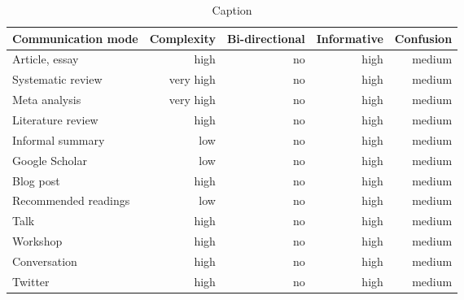 \begin{table*}\centering
{}
\begin{tabular}{@{}lrrrr@{}}\toprule
Communication mode & Complexity & Bi-directional & Informative  & Confusion
\\\midrule
Article, essay      & high & no & high & medium  \\
Systematic review   & very high & no & high & medium\\
Meta analysis       & very high & no & high & medium\\
Literature review   & high & no & high & medium\\
Informal summary    & low & no & high & medium\\
Google Scholar      & low & no & high & medium\\
Blog post           & high & no & high & medium\\
Recommended readings& low & no & high & medium\\
Talk                & high & no & high & medium\\
Workshop            & high & no & high & medium\\
Conversation        & high & no & high & medium\\
Twitter             & high & no & high & medium\\
\bottomrule
\end{tabular}
\caption{Caption}
\end{table*}